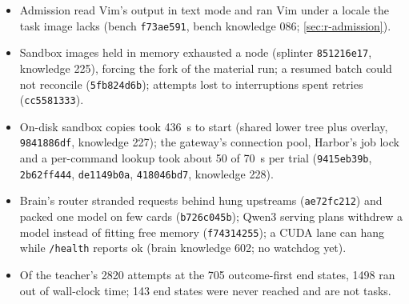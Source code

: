 \begin{itemize}
\item Admission read Vim's output in text mode and ran Vim under a locale the task image lacks (bench \texttt{f73ae591},
  bench knowledge 086; \cref{sec:r-admission}).
\item Sandbox images held in memory exhausted a node (splinter \texttt{851216e17}, knowledge 225), forcing the fork of the
  material run; a resumed batch could not reconcile (\texttt{5fb824d6b}); attempts lost to interruptions spent retries
  (\texttt{cc5581333}).
\item On-disk sandbox copies took 436~s to start (shared lower tree plus overlay, \texttt{9841886df}, knowledge 227); the
  gateway's connection pool, Harbor's job lock and a per-command lookup took about 50 of 70~s per trial (\texttt{9415eb39b},
  \texttt{2b62ff444}, \texttt{de1149b0a}, \texttt{418046bd7}, knowledge 228).
\item Brain's router stranded requests behind hung upstreams (\texttt{ae72fc212}) and packed one model on few cards
  (\texttt{b726c045b}); Qwen3 serving plans withdrew a model instead of fitting free memory (\texttt{f74314255}); a CUDA lane
  can hang while \texttt{/health} reports ok (brain knowledge 602; no watchdog yet).
\item Of the teacher's 2820 attempts at the 705 outcome-first end states, 1498 ran out of wall-clock time; 143 end states were
  never reached and are not tasks.
\end{itemize}
